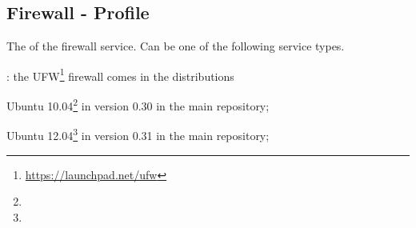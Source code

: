 \label{sec:firewall_profile}
\subsection{Firewall - Profile}


The  of the firewall service. Can be one of the following 
service types.
\begin{asparaitem}
%
\item[\qcode{ufw}:] 
the UFW\footnote{\url{https://launchpad.net/ufw}} firewall comes in the distributions 
\begin{compactitem}
\item[\TheDistribution{ubuntu}] Ubuntu 10.04\footnote{\TheUbuntuMaverickLTSDate} in version 0.30 in the main repository;
\item[\TheDistribution{ubuntu}] Ubuntu 12.04\footnote{\TheUbuntuPreciseLTSDate} in version 0.31 in the main repository;
\end{compactitem}
%
\end{asparaitem}

